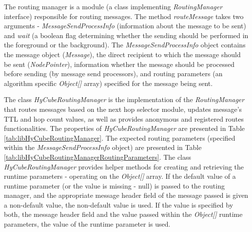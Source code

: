 The routing manager is a module (a class implementing \emph{RoutingManager} interface) responsible for routing messages. The method \emph{routeMessage} takes two arguments - \emph{MessageSendProcessInfo} (information about the message to be sent) and \emph{wait} (a boolean flag determining whether the sending should be performed in the foreground or the background). The \emph{MessageSendProcessInfo} object contains the message object (\emph{Message}), the direct recipient to which the message should be sent (\emph{NodePointer}), information whether the message should be processed before sending (by message send processors), and routing parameters (an algorithm specific \emph{Object[]} array) specified for the message being sent.

The class \emph{HyCubeRoutingManager} is the implementation of the \emph{RoutingManager} that routes messages based on the next hop selector module, updates message's TTL and hop count values, as well as provides anonymous and registered routes functionalities. The properties of \emph{HyCubeRoutingManager} are presented in Table \ref{tab:libHyCubeRoutingManager}. The expected routing parameters (specified within the \emph{MessageSendProcessInfo} object) are presented in Table \ref{tab:libHyCubeRoutingManagerRoutingParameters}. The class \emph{HyCubeRoutingManager} provides helper methods for creating and retrieving the runtime parameters - operating on the \emph{Object[]} array. If the default value of a runtime parameter (or the value is missing - null) is passed to the routing manager, and the appropriate message header field of the message passed is given a non-default value, the non-default value is used. If the value is specified by both, the message header field and the value passed within the \emph{Object[]} runtime parameters, the value of the runtime parameter is used.

